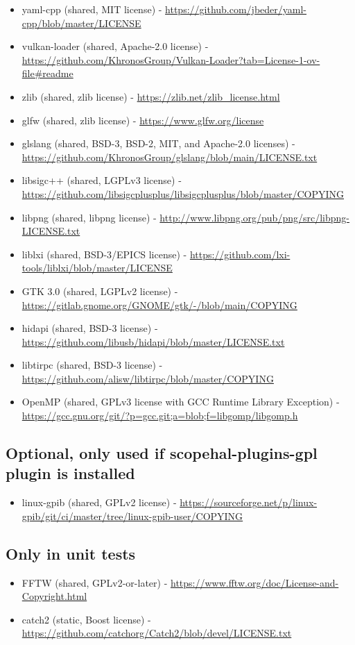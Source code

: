 \begin{itemize}
\item yaml-cpp (shared, MIT license) - \url{https://github.com/jbeder/yaml-cpp/blob/master/LICENSE}
\item vulkan-loader (shared, Apache-2.0 license) - \url{https://github.com/KhronosGroup/Vulkan-Loader?tab=License-1-ov-file#readme}
\item zlib (shared, zlib license) - \url{https://zlib.net/zlib_license.html}
\item glfw (shared, zlib license) - \url{https://www.glfw.org/license}
\item glslang (shared, BSD-3, BSD-2, MIT, and Apache-2.0 licenses) - \url{https://github.com/KhronosGroup/glslang/blob/main/LICENSE.txt}
\item libsigc++ (shared, LGPLv3 license) - \url{https://github.com/libsigcplusplus/libsigcplusplus/blob/master/COPYING}
\item libpng (shared, libpng license) - \url{http://www.libpng.org/pub/png/src/libpng-LICENSE.txt}
\item liblxi (shared, BSD-3/EPICS license) - \url{https://github.com/lxi-tools/liblxi/blob/master/LICENSE}
\item GTK 3.0 (shared, LGPLv2 license) - \url{https://gitlab.gnome.org/GNOME/gtk/-/blob/main/COPYING}
\item hidapi (shared, BSD-3 license) - \url{https://github.com/libusb/hidapi/blob/master/LICENSE.txt}
\item libtirpc (shared, BSD-3 license) - \url{https://github.com/alisw/libtirpc/blob/master/COPYING}
\item OpenMP (shared, GPLv3 license with GCC Runtime Library Exception) - \url{https://gcc.gnu.org/git/?p=gcc.git;a=blob;f=libgomp/libgomp.h}
\end{itemize}

\subsection{Optional, only used if scopehal-plugins-gpl plugin is installed}
\begin{itemize}
\item linux-gpib (shared, GPLv2 license) - \url{https://sourceforge.net/p/linux-gpib/git/ci/master/tree/linux-gpib-user/COPYING}
\end{itemize}

\subsection{Only in unit tests}
\begin{itemize}
\item FFTW (shared, GPLv2-or-later) - \url{https://www.fftw.org/doc/License-and-Copyright.html}
\item catch2 (static, Boost license) - \url{https://github.com/catchorg/Catch2/blob/devel/LICENSE.txt}
\end{itemize}
